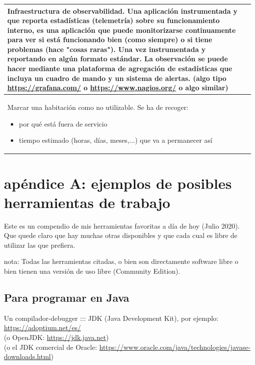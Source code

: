 \documentclass[spanish,12pt,a4paper,final,oneside]{book}
\begin{document}
\begin{longtable}{|p{7cm}|p{7cm}|}
Infraestructura de observabilidad.
\newline \newline
Una aplicación instrumentada y que reporta estadísticas (telemetría) sobre su funcionamiento interno, es una aplicación que puede monitorizarse continuamente para ver si está funcionando bien (como siempre) o si tiene problemas (hace "cosas raras").
\newline \newline
Una vez instrumentada y reportando en algún formato estándar. La observación se puede hacer mediante una plataforma de agregación de estadísticas que incluya un cuadro de mando y un sistema de alertas. (algo tipo \url{https://grafana.com/} o \url{https://www.nagios.org/} o algo similar)

\\ \hline

Marcar una habitación como no utilizable.
\newline \newline
Se ha de recoger:
\begin{itemize}
\item por qué está fuera de servicio
\item tiempo estimado (horas, días, meses,...) que va a permanecer así
\end{itemize}

&


\\ \hline

\end{longtable}







\chapter{apéndice A: ejemplos de posibles herramientas de trabajo}
Este es un compendio de mis herramientas favoritas a día de hoy (Julio 2020). Que quede claro que hay muchas otras disponibles y que cada cual es libre de utilizar las que prefiera.

nota: Todas las herramientas citadas, o bien son directamente software libre o bien tienen una versión de uso libre (Community Edition).

\section{Para programar en Java}
Un compilador-debugger ::: JDK (Java Development Kit), por ejemplo:
\\ \url{https://adoptium.net/es/}
\\ (o OpenJDK: \url{https://jdk.java.net})
\\ (o el JDK comercial de Oracle: \url{https://www.oracle.com/java/technologies/javase-downloads.html})
\end{document}
